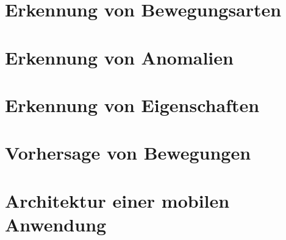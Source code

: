 \section{Erkennung von Bewegungsarten}
\section{Erkennung von Anomalien}
\section{Erkennung von Eigenschaften}
\section{Vorhersage von Bewegungen}
\section{Architektur einer mobilen Anwendung}